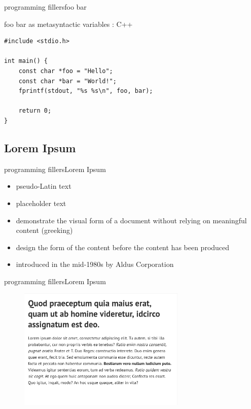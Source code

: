 \documentclass[10pt]{beamer}
\begin{document}
\begin{frame}[fragile]{programming fillers}{foo bar} 
\begin{block}{foo bar as metasyntactic variables : C++}
\begin{lstlisting}
#include <stdio.h>

int main() {
    const char *foo = "Hello";
    const char *bar = "World!";
    fprintf(stdout, "%s %s\n", foo, bar);

    return 0;
}
\end{lstlisting}
\end{block}

\end{frame}

\subsection{Lorem Ipsum}
\begin{frame}{programming fillers}{Lorem Ipsum} 
\begin{itemize}
	\item pseudo-Latin text
	\item placeholder text
	\item demonstrate the visual form of a document without relying on meaningful content (greeking)
	\item design the form of the content before the content has been produced
	\item introduced in the mid-1980s by Aldus Corporation
\end{itemize}

\end{frame}


\begin{frame}{programming fillers}{Lorem Ipsum} 
\begin{figure}[t]
	\includegraphics[width=8cm]{Feathergraphics/lorem}
	\centering
\end{figure}
\end{frame}
\end{document}
